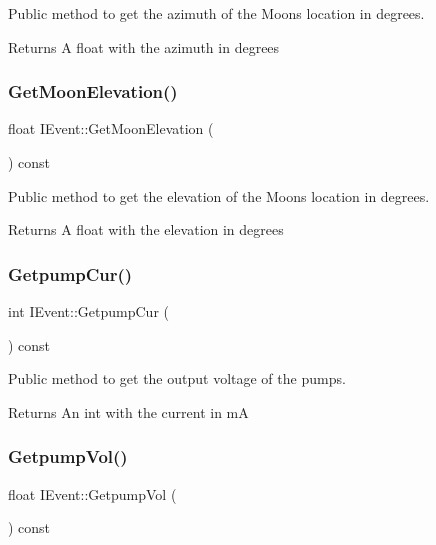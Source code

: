 Public method to get the azimuth of the Moon\textquotesingle{}s location in degrees. 

\begin{DoxyReturn}{Returns}
A float with the azimuth in degrees 
\end{DoxyReturn}
\mbox{\label{classIEvent_a7d2d4ae598274c81b51392cff18194c8}} 
\subsubsection{\texorpdfstring{Get\+Moon\+Elevation()}{GetMoonElevation()}}
{\footnotesize\ttfamily float I\+Event\+::\+Get\+Moon\+Elevation (\begin{DoxyParamCaption}{ }\end{DoxyParamCaption}) const}



Public method to get the elevation of the Moon\textquotesingle{}s location in degrees. 

\begin{DoxyReturn}{Returns}
A float with the elevation in degrees 
\end{DoxyReturn}
\mbox{\label{classIEvent_a7acdfd044d5d5e099b6a7d1d6f9d7cd1}} 
\subsubsection{\texorpdfstring{Getpump\+Cur()}{GetpumpCur()}}
{\footnotesize\ttfamily int I\+Event\+::\+Getpump\+Cur (\begin{DoxyParamCaption}{ }\end{DoxyParamCaption}) const}



Public method to get the output voltage of the pumps. 

\begin{DoxyReturn}{Returns}
An int with the current in mA 
\end{DoxyReturn}
\mbox{\label{classIEvent_aa4a82c9fd9a99eee0f84c42d539517bd}} 
\subsubsection{\texorpdfstring{Getpump\+Vol()}{GetpumpVol()}}
{\footnotesize\ttfamily float I\+Event\+::\+Getpump\+Vol (\begin{DoxyParamCaption}{ }\end{DoxyParamCaption}) const}



